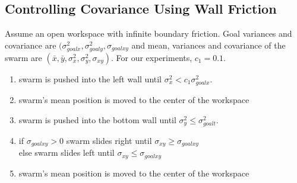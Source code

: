 \subsection{Controlling Covariance Using Wall Friction}\label{subsec:ClosedLoopCovarianceControl}
Assume an open workspace with infinite boundary friction. Goal variances and covariance are  $(\sigma_{goalx}^2,\sigma_{goaly}^2, \sigma_{goalxy}$ and mean, variances and covariance of the swarm  are $( \bar{x},\bar{y},\sigma_x^2,\sigma_y^2, \sigma_{xy})$. For our experiments, $c_1 = 0.1$.
\begin{enumerate}
\item swarm is pushed into the left wall until $\sigma_x^2< c_1\sigma_{goalx}^2$.  
\item swarm's mean position is moved to the center of the workspace
\item swarm is pushed into the bottom wall until $\sigma_y^2 \le \sigma_{goalt}^2$. 
\item if $\sigma_{goalxy}>0$ swarm slides right until $\sigma_{xy} \ge \sigma_{goalxy}$ \\
else swarm slides left until $\sigma_{xy} \le \sigma_{goalxy}$ 
\item  swarm's mean position is moved to the center of the workspace
\end{enumerate}


